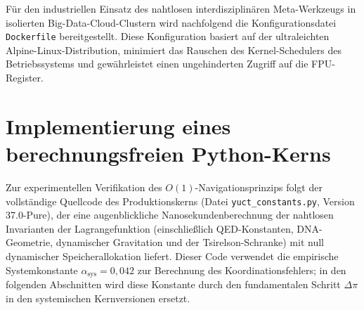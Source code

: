 \documentclass[12pt,a4paper]{article}
\begin{document}
	
	Für den industriellen Einsatz des nahtlosen interdisziplinären Meta-Werkzeugs in isolierten Big-Data-Cloud-Clustern wird nachfolgend die Konfigurationsdatei \texttt{Dockerfile} bereitgestellt. Diese Konfiguration basiert auf der ultraleichten Alpine-Linux-Distribution, minimiert das Rauschen des Kernel-Schedulers des Betriebssystems und gewährleistet einen ungehinderten Zugriff auf die FPU-Register.
	
	
	
	\section{Implementierung eines berechnungsfreien Python-Kerns}
	Zur experimentellen Verifikation des \(O(1)\)-Navigationsprinzips folgt der vollständige Quellcode des Produktionskerns (Datei \texttt{yuct\_constants.py}, Version 37.0-Pure), der eine augenblickliche Nanosekundenberechnung der nahtlosen Invarianten der Lagrangefunktion (einschließlich QED-Konstanten, DNA-Geometrie, dynamischer Gravitation und der Tsirelson-Schranke) mit null dynamischer Speicherallokation liefert. Dieser Code verwendet die empirische Systemkonstante \(\alpha_{\text{sys}} = 0{,}042\) zur Berechnung des Koordinationsfehlers; in den folgenden Abschnitten wird diese Konstante durch den fundamentalen Schritt \(\Delta\pi\) in den systemischen Kernversionen ersetzt.
	
\end{document}
